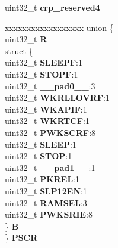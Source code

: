 \begin{DoxyCompactItemize}
\begin{tabbing}
\end{tabbing}\item 
\mbox{\label{structCRP__tag_ac7d33cc61ecc3778a74ec6d098322fbf}} 
uint32\+\_\+t {\bfseries crp\+\_\+reserved4}
\item 
\mbox{\label{structCRP__tag_ad0371c36b3f3c7ec2985913e56f62211}} 
\begin{tabbing}
xx\=xx\=xx\=xx\=xx\=xx\=xx\=xx\=xx\=\kill
union \{\\
\>uint32\_t {\bfseries R}\\
\>struct \{\\
\>\>uint32\_t {\bfseries SLEEPF}:1\\
\>\>uint32\_t {\bfseries STOPF}:1\\
\>\>uint32\_t {\bfseries \_\_pad0\_\_}:3\\
\>\>uint32\_t {\bfseries WKRLLOVRF}:1\\
\>\>uint32\_t {\bfseries WKAPIF}:1\\
\>\>uint32\_t {\bfseries WKRTCF}:1\\
\>\>uint32\_t {\bfseries PWKSCRF}:8\\
\>\>uint32\_t {\bfseries SLEEP}:1\\
\>\>uint32\_t {\bfseries STOP}:1\\
\>\>uint32\_t {\bfseries \_\_pad1\_\_}:1\\
\>\>uint32\_t {\bfseries PKREL}:1\\
\>\>uint32\_t {\bfseries SLP12EN}:1\\
\>\>uint32\_t {\bfseries RAMSEL}:3\\
\>\>uint32\_t {\bfseries PWKSRIE}:8\\
\>\} {\bfseries B}\\
\} {\bfseries PSCR}\\


\end{tabbing}
\end{DoxyCompactItemize}
